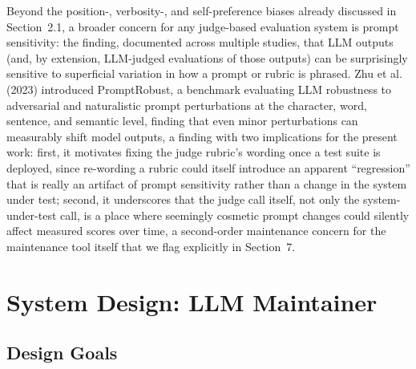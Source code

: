 \documentclass[11pt,a4paper]{article}
\begin{document}
Beyond the position-, verbosity-, and self-preference biases already
discussed in Section~2.1, a broader concern for any judge-based
evaluation system is prompt sensitivity: the finding, documented across
multiple studies, that LLM outputs (and, by extension, LLM-judged
evaluations of those outputs) can be surprisingly sensitive to
superficial variation in how a prompt or rubric is phrased. Zhu et al.
(2023) introduced PromptRobust, a benchmark evaluating LLM robustness to
adversarial and naturalistic prompt perturbations at the character,
word, sentence, and semantic level, finding that even minor
perturbations can measurably shift model outputs, a finding with two
implications for the present work: first, it motivates fixing the judge
rubric's wording once a test suite is deployed, since
re-wording a rubric could itself introduce an apparent ``regression'' that
is really an artifact of prompt sensitivity rather than a change in the
system under test; second, it underscores that the judge call itself,
not only the system-under-test call, is a place where seemingly cosmetic
prompt changes could silently affect measured scores over time, a
second-order maintenance concern for the maintenance tool itself that we
flag explicitly in Section~7.

\section{System Design: LLM Maintainer}

\subsection{Design Goals}
\end{document}
